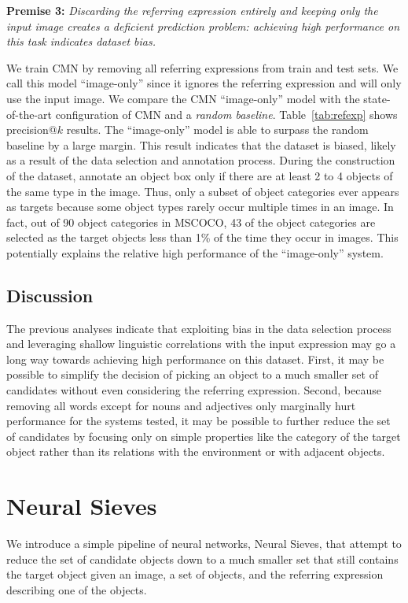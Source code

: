 \documentclass[11pt,a4paper]{article}
\begin{document}
\noindent\textbf{Premise 3:} \textit{ Discarding the referring expression entirely and keeping only the input image creates a deficient prediction problem: achieving high performance on this task indicates dataset bias.}

We train CMN by removing all referring expressions from train and test sets.
We call this model ``image-only'' since it ignores the referring expression and will only use the input image. 
We compare the CMN ``image-only'' model with the state-of-the-art configuration of CMN and a \textit{random baseline}. 
\tableseven
Table~\ref{tab:refexp} shows precision@$k$ results.
The ``image-only'' model
is able to surpass the random baseline by a large margin.
This result indicates that the dataset is biased, likely as a result of the data selection and annotation process.
During the construction of the dataset, \citet{mao2016generation} annotate an object box only if there are at least 2 to 4 objects of the same type in the image.
Thus, only a subset of object categories ever appears as targets because some object types rarely occur multiple times in an image.
In fact, out of 90 object categories in MSCOCO, 43 of the object categories are selected as the target objects less than 1\% of the time they occur in images.
This potentially explains the relative high performance of the ``image-only'' system.

\subsection{Discussion}%
The previous analyses indicate that exploiting bias in the data selection process and leveraging shallow linguistic correlations with the input expression may go a long way towards achieving high performance on this dataset.
First, it may be possible to simplify the decision of picking an object to a much smaller set of candidates without even considering the referring expression. 
Second, because removing all words except for nouns and adjectives only marginally hurt performance for the systems tested, it may be possible to further reduce the set of candidates by focusing only on simple properties like the category of the target object rather than its relations with the environment or with adjacent objects.  
\vspace{-5pt}
\section{Neural Sieves} \label{sec:neuralsieves}
\vspace{-5pt}
We introduce a simple pipeline of neural networks, Neural Sieves, that attempt to reduce the set of candidate objects down to a much smaller set that still contains the target object given an image, a set of objects, and the referring expression describing one of the objects.
\end{document}
